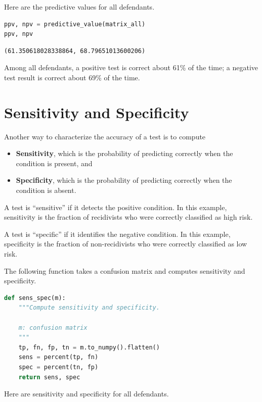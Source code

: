 Here are the predictive values for all defendants.

\begin{lstlisting}[language=Python,style=source]
ppv, npv = predictive_value(matrix_all)
ppv, npv
\end{lstlisting}

\begin{lstlisting}[style=output]
(61.350618028338864, 68.79651013600206)
\end{lstlisting}

Among all defendants, a positive test is correct about 61\% of the time;
a negative test result is correct about 69\% of the time.

\hypertarget{sensitivity-and-specificity}{%
\section{Sensitivity and
Specificity}\label{sensitivity-and-specificity}}

Another way to characterize the accuracy of a test is to compute

\begin{itemize}
\item
  \textbf{Sensitivity}, which is the probability of predicting correctly
  when the condition is present, and
\item
  \textbf{Specificity}, which is the probability of predicting correctly
  when the condition is absent.
\end{itemize}

A test is ``sensitive'' if it detects the positive condition. In this
example, sensitivity is the fraction of recidivists who were correctly
classified as high risk.

A test is ``specific'' if it identifies the negative condition. In this
example, specificity is the fraction of non-recidivists who were
correctly classified as low risk.

The following function takes a confusion matrix and computes sensitivity
and specificity.

\begin{lstlisting}[language=Python,style=source]
def sens_spec(m):
    """Compute sensitivity and specificity.

    m: confusion matrix
    """
    tp, fn, fp, tn = m.to_numpy().flatten()
    sens = percent(tp, fn)
    spec = percent(tn, fp)
    return sens, spec
\end{lstlisting}

Here are sensitivity and specificity for all defendants.

